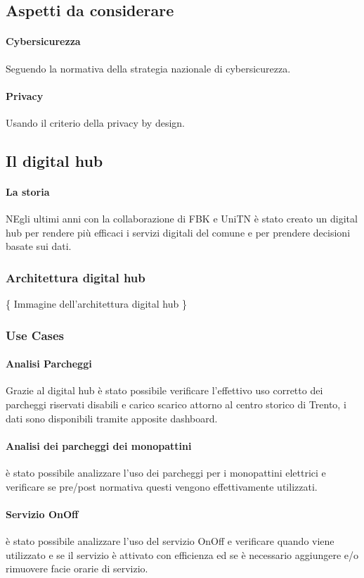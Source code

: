         \subsection{Aspetti da considerare}
            \paragraph{Cybersicurezza} Seguendo la normativa della strategia nazionale di cybersicurezza.
            \paragraph{Privacy} Usando il criterio della privacy by design.
        \subsection{Il digital hub}
        \paragraph{La storia} NEgli ultimi anni con la collaborazione di FBK e UniTN è stato creato un digital hub per rendere più efficaci i servizi digitali del comune e per prendere decisioni basate sui dati.
        \subsubsection{Architettura digital hub}
                \{ Immagine dell'architettura digital hub \}
        \subsubsection{Use Cases}
            \paragraph{Analisi Parcheggi} Grazie al digital hub è stato possibile verificare l'effettivo uso corretto dei parcheggi riservati disabili e carico scarico attorno al centro storico di Trento, i dati sono disponibili tramite apposite dashboard.
            \paragraph{Analisi dei parcheggi dei monopattini} è stato possibile analizzare l'uso dei parcheggi per i monopattini elettrici e verificare se pre/post normativa questi vengono effettivamente utilizzati.
            \paragraph{Servizio OnOff} è stato possibile analizzare l'uso del servizio OnOff e verificare quando viene utilizzato e se il servizio è attivato con efficienza ed se è necessario aggiungere e/o rimuovere facie orarie di servizio.
